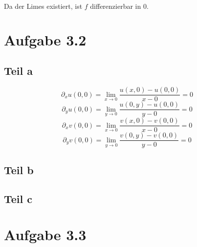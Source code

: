 \documentclass[10pt,a4paper]{article}
\begin{document}
Da der Limes existiert, ist $f$ differenzierbar in $0$.

\section{Aufgabe 3.2}

\subsection{Teil a}

\begin{equation}
  \partial_{x} u(0, 0) = \lim_{x \to 0} \frac{u(x, 0) - u(0, 0)}{x - 0} = 0
\end{equation}
\begin{equation}
  \partial_{y} u(0, 0) = \lim_{y \to 0} \frac{u(0, y) - u(0, 0)}{y - 0} = 0
\end{equation}
\begin{equation}
  \partial_{x} v(0, 0) = \lim_{x \to 0} \frac{v(x, 0) - v(0, 0)}{x - 0} = 0
\end{equation}
\begin{equation}
  \partial_{y} v(0, 0) = \lim_{y \to 0} \frac{v(0, y) - v(0, 0)}{y - 0} = 0
\end{equation}

\subsection{Teil b}

\subsection{Teil c}

\section{Aufgabe 3.3}
\end{document}
